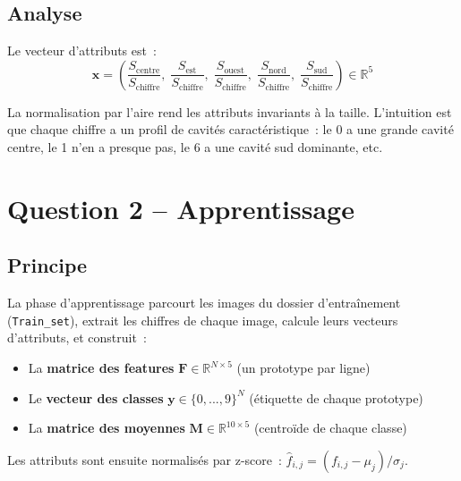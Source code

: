 \documentclass[a4paper,11pt]{article}
\begin{document}
\subsection{Analyse}

Le vecteur d'attributs est~:
\[
\mathbf{x} = \left(\frac{S_{\text{centre}}}{S_{\text{chiffre}}},\; \frac{S_{\text{est}}}{S_{\text{chiffre}}},\; \frac{S_{\text{ouest}}}{S_{\text{chiffre}}},\; \frac{S_{\text{nord}}}{S_{\text{chiffre}}},\; \frac{S_{\text{sud}}}{S_{\text{chiffre}}}\right) \in \mathbb{R}^5
\]

La normalisation par l'aire rend les attributs invariants à la taille. L'intuition est que chaque chiffre a un profil de cavités caractéristique~: le 0 a une grande cavité centre, le 1 n'en a presque pas, le 6 a une cavité sud dominante, etc.


\section{Question 2 -- Apprentissage}

\subsection{Principe}

La phase d'apprentissage parcourt les images du dossier d'entraînement (\texttt{Train\_set}), extrait les chiffres de chaque image, calcule leurs vecteurs d'attributs, et construit~:
\begin{itemize}
    \item La \textbf{matrice des features} $\mathbf{F} \in \mathbb{R}^{N \times 5}$ (un prototype par ligne)
    \item Le \textbf{vecteur des classes} $\mathbf{y} \in \{0,...,9\}^N$ (étiquette de chaque prototype)
    \item La \textbf{matrice des moyennes} $\mathbf{M} \in \mathbb{R}^{10 \times 5}$ (centroïde de chaque classe)
\end{itemize}

Les attributs sont ensuite normalisés par z-score~: $\hat{f}_{i,j} = (f_{i,j} - \mu_j) / \sigma_j$.
\end{document}
